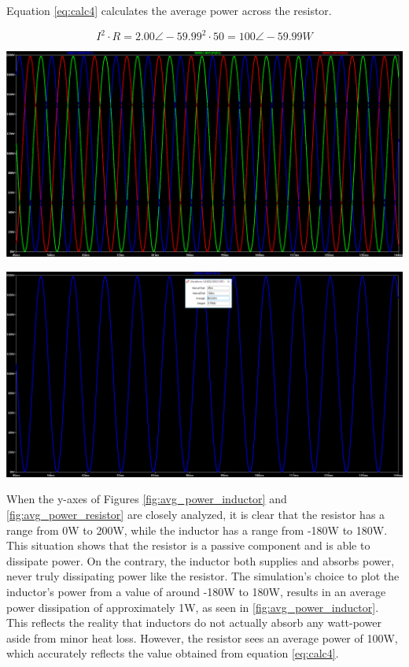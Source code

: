 \documentclass[journal]{IEEEtran}
\begin{document}
\noindent Equation \ref{eq:calc4} calculates the average power across the resistor.

\begin{equation} 
I^2 \cdot R = {2.00 \angle -59.99}^2 \cdot 50 = 100 \angle -59.99 W
\label{eq:calc4}
\end{equation}


\begingroup
    \centering
    \medskip
    \includegraphics[width=\columnwidth]{images/Lab_9_ss_13.PNG}
    \label{fig:inst_power_rsistor}
    \medskip
\endgroup

\begingroup
    \centering
    \medskip
    \includegraphics[width=\columnwidth]{images/Lab_9_ss_16.PNG}
    \label{fig:avg_power_resistor}
    \medskip
\endgroup


\noindent When the y-axes of Figures \ref{fig:avg_power_inductor} and  \ref{fig:avg_power_resistor} are closely analyzed, it is clear that the resistor has a range from 0W to 200W, while the inductor has a range from -180W to 180W. This situation shows that the resistor is a passive component and is able to dissipate power. On the contrary, the inductor both supplies and absorbs power, never truly dissipating power like the resistor. The simulation's choice to plot the inductor's power from a value of around -180W to 180W, results in an average power dissipation of approximately 1W, as seen in \ref{fig:avg_power_inductor}. This reflects the reality that inductors do not actually absorb any watt-power aside from minor heat loss. However, the resistor sees an average power of 100W, which accurately reflects the value obtained from equation \ref{eq:calc4}.
\end{document}
